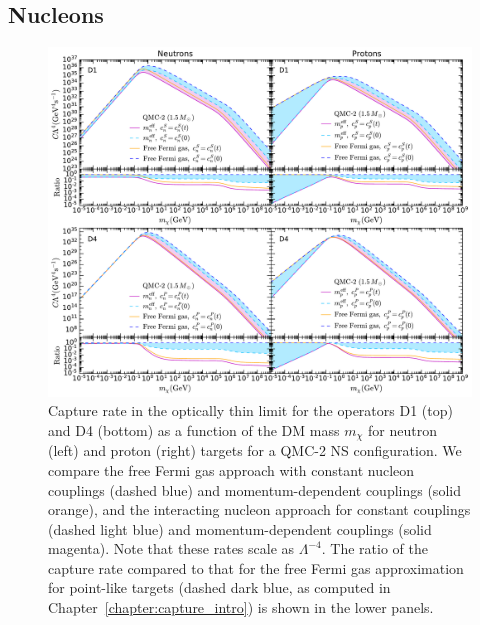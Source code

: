 \subsection{Nucleons}
\label{sec:capresnucleons}

\begin{figure}[t!bp] 
\centering
\includegraphics[width=\textwidth]{capture_3/C_mDM_N_QMC_D1_D4_ratio.pdf}
\caption[Capture rate in the optically thin limit for the operators D1 (top) and D4 (bottom) as a function of the DM mass $m_\chi$ for neutron (left) and proton (right) targets, for a QMC-2 NS configuration.]{
Capture rate in the optically thin limit for the operators D1 (top) and D4 (bottom) as a function of the DM mass $m_\chi$ for neutron (left) and proton (right) targets for a QMC-2 NS configuration.  We compare the free Fermi gas approach with constant nucleon couplings (dashed blue) and momentum-dependent couplings (solid orange), and the interacting nucleon approach for constant couplings (dashed light blue) and momentum-dependent couplings (solid magenta). Note that these rates scale as $\Lambda^{-4}$. 
The ratio of the capture rate compared to that for the free Fermi gas approximation for point-like targets (dashed dark blue, as computed in Chapter~\ref{chapter:capture_intro}) is shown in the lower panels. 
}
\label{ch5:fig:capratesD1D4}
\end{figure} 

